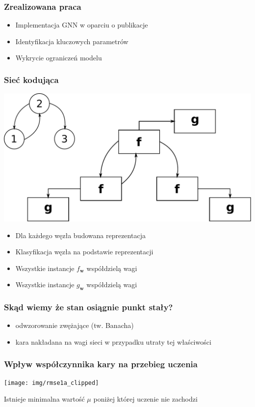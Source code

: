 \documentclass{beamer}
\begin{document}
\begin{frame}
\frametitle{Zrealizowana praca}
\begin{itemize}
	\item Implementacja GNN w oparciu o publikacje
	\item Identyfikacja kluczowych parametrów
	\item Wykrycie ograniczeń modelu
\end{itemize}
\end{frame}

\begin{frame}
\frametitle{Sieć kodująca}
\begin{center}
	\includegraphics[scale=0.4]{img/encodinginc}
\end{center}
\begin{itemize}
	\item Dla każdego węzła budowana reprezentacja
	\item Klasyfikacja węzła na podstawie reprezentacji
	\item Wszystkie instancje $f_{\bm{w}}$ współdzielą wagi
	\item Wszystkie instancje $g_{\bm{w}}$ współdzielą wagi
\end{itemize}
\end{frame}

\begin{frame}
\frametitle{Skąd wiemy że stan osiągnie punkt stały?}
\begin{itemize}
	\item odwzorowanie zwężające (tw. Banacha)
	\item kara nakładana na wagi sieci w przypadku utraty tej właściwości
\end{itemize}
\end{frame}

\begin{frame}
\frametitle{Wpływ współczynnika kary na przebieg uczenia}
\begin{center}
	\texttt{[image: img/rmse1a\_clipped]}
\end{center}
Istnieje minimalna wartość $\mu$ poniżej której uczenie nie zachodzi
\end{frame}
\end{document}
